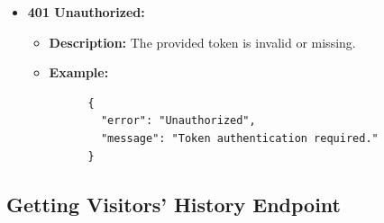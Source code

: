 \documentclass[a4 paper, 12pt]{article}
\begin{document}
\begin{enumerate}
\begin{itemize}
    \item \textbf{401 Unauthorized:}
    \begin{itemize}
      \item \textbf{Description:} The provided token is invalid or missing.
      \item \textbf{Example:}
      \begin{verbatim}
      {
        "error": "Unauthorized",
        "message": "Token authentication required."
      }
      \end{verbatim}
    \end{itemize}
  \end{itemize}
\end{enumerate}
\subsection{Getting Visitors' History Endpoint}
\end{document}
